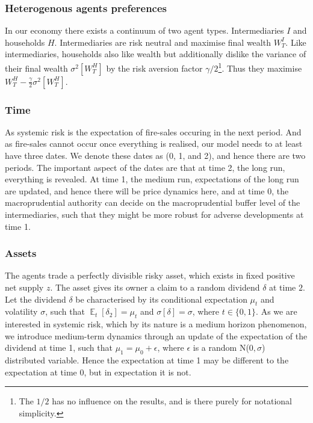 \documentclass[11pt]{article}
\DeclareMathOperator{\E}{\mathbb{E}} %
\begin{document}
\subsubsection*{Heterogenous agents preferences}

In our economy there exists a continuum of two agent types. Intermediaries $I$ and households $H$. Intermediaries are risk neutral and maximise final wealth $W^I_T$. Like intermediaries, households also like wealth but additionally dislike the variance of their final wealth $\sigma^2[W^H_T]$ by the risk aversion factor $\gamma/2$\footnote{The $1/2$ has no influence on the results, and is there purely for notational simplicity.}. Thus they maximise $W^H_T - \frac{\gamma}{2}\sigma^2[W^H_T]$.

\subsubsection*{Time}
As systemic risk is the expectation of fire-sales occuring in the next period. And as fire-sales cannot occur once everything is realised, our model needs to at least have three dates. We denote these dates as (0, 1, and 2), and hence there are two periods. The important aspect of the dates are that at time 2, the long run, everything is revealed. At time 1, the medium run, expectations of the long run are updated, and hence there will be price dynamics here, and at time 0, the macroprudential authority can decide on the macroprudential buffer level of the intermediaries, such that they might be more robust for adverse developments at time 1.


\subsubsection*{Assets}

The agents trade a perfectly divisible risky asset, which exists in fixed positive net supply $z$. The asset gives its owner a claim to a random dividend $\delta$ at time $2$. Let the dividend $\delta$ be characterised by its conditional expectation $\mu_t$ and volatility $\sigma$, such that $\E_t[\delta_2] = \mu_t$ and $\sigma[\delta] = \sigma$, where $t\in\{0,1\}$. As we are interested in systemic risk, which by its nature is a medium horizon phenomenon, we introduce medium-term dynamics through an update of the expectation of the dividend at time 1, such that $\mu_1 = \mu_0 + \epsilon$, where $\epsilon$ is a random N($0,\sigma$) distributed variable. Hence the expectation at time 1 may be different to the expectation at time 0, but in expectation it is not.
\end{document}
